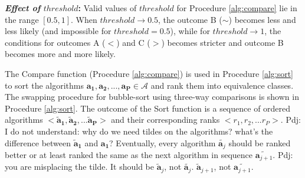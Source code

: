 \documentclass[conference]{IEEEtran}
\newcommand{\p}[1]{{\color{blue} Pdj: #1}}
\begin{document}
%

\textbf{\textit{Effect of }$threshold$:} Valid values of $threshold$ for Procedure \ref{alg:compare} lie in the range $[0.5,1]$. When $threshold \to 0.5$, the outcome B ($\sim$) becomes
less and less likely (and impossible for $threshold=0.5$), while for $threshold \to 1$, the conditions for outcomes A ($<$)
and C ($>$) becomes stricter and outcome B becomes more and more likely. 

The Compare function (Procedure \ref{alg:compare}) is used in Procedure \ref{alg:sort} to sort the algorithms $\mathbf{a_1},\mathbf{a_2}, ..., \mathbf{a_P} \in \mathcal{A}$
and rank them into equivalence classes.
The swapping procedure for bubble-sort using three-way comparisons is shown in
Procedure \ref{alg:sort}.
The outcome of the Sort function is a sequence of ordered algorithms $<\mathbf{\tilde{a}_1}, \mathbf{\tilde{a}_2},
... \mathbf{\tilde{a}_P}>$ and their corresponding ranks $ <r_1,r_2,...r_P> $.
\p{I do not understand: why do we need tildes on the algorithms? what's the difference between $\mathbf{\tilde{a}_1}$
  and $\mathbf{{a}_1}$?}
Eventually, every algorithm
$\tilde{\mathbf{a}_j}$ should be ranked better or at least ranked the same as the next algorithm in sequence
$\tilde{\mathbf{a}_{j+1}}$.
\p{you are misplacing the tilde. It should be $\tilde{\mathbf{a}}_j$, not $\tilde{\mathbf{a}_j}$.
  $\tilde{\mathbf{a}}_{j+1}$, not $\tilde{\mathbf{a}_{j+1}}$.}
\end{document}
